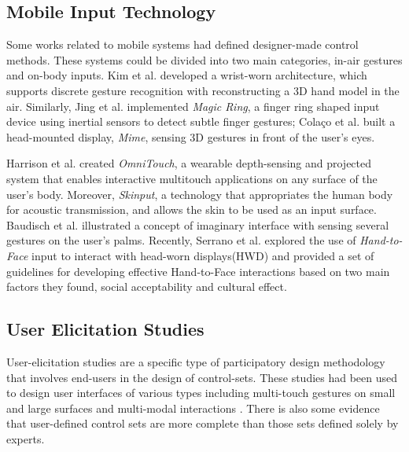 \documentclass{sigchi}
\begin{document}
    \subsection{Mobile Input Technology}
    Some works related to mobile systems had defined designer-made control methods. These systems could be divided into two main categories, in-air gestures and on-body inputs. Kim et al.\cite{Kim:2012:DFI:2380116.2380139} developed a wrist-worn architecture, which supports discrete gesture recognition with reconstructing a 3D hand model in the air. Similarly, Jing et al.\cite{Jing:2013:MRS:2541831.2541875} implemented \textsl{Magic Ring}, a finger ring shaped input device using inertial sensors to detect subtle finger gestures; Cola\c{c}o et al.\cite{Colaco:2013:MCL:2501988.2502042} built a head-mounted display, \textsl{Mime}, sensing 3D gestures in front of the user's eyes. 

    Harrison et al.\cite{Harrison:2011:OWM:2047196.2047255} created \textsl{OmniTouch}, a wearable depth-sensing and projected system that enables interactive multitouch applications on any surface of the user's body. Moreover, \textsl{Skinput}\cite{Harrison:2010:SAB:1753326.1753394}, a technology that appropriates the human body for acoustic transmission, and allows the skin to be used as an input surface. Baudisch et al.\cite{Gustafson:2011:IPL:2047196.2047233} illustrated a concept of imaginary interface with sensing several gestures on the user's palms. Recently, Serrano et al.\cite{Serrano:2014:EUH:2611247.2556984} explored the use of \textsl{Hand-to-Face} input to interact with head-worn displays(HWD) and provided a set of guidelines for developing effective Hand-to-Face interactions based on two main factors they found, social acceptability and cultural effect.

    \subsection{User Elicitation Studies}
    User-elicitation studies are a specific type of participatory design methodology that involves end-users in the design of control-sets\cite{Good:1984:BUI:358274.358284,Morris:2012:WWI:2396636.2396651}. These studies had been used to design user interfaces of various types including multi-touch gestures on small and large surfaces\cite{Anthony:2012:IRC:2396636.2396671,Epps:2006:SHS:1125451.1125601,Wobbrock:2009:UGS:1518701.1518866,Findlater:2012:BQA:2207676.2208660} and multi-modal interactions \cite{Morris:2012:WWI:2396636.2396651,Valdes:2014:EDS:2611222.2557373}. There is also some evidence that user-defined control sets are more complete than those sets defined solely by experts\cite{Anthony:2012:IRC:2396636.2396671,Pyryeskin:2012:CEG:2396636.2396638,Wobbrock:2009:UGS:1518701.1518866}.
\end{document}
